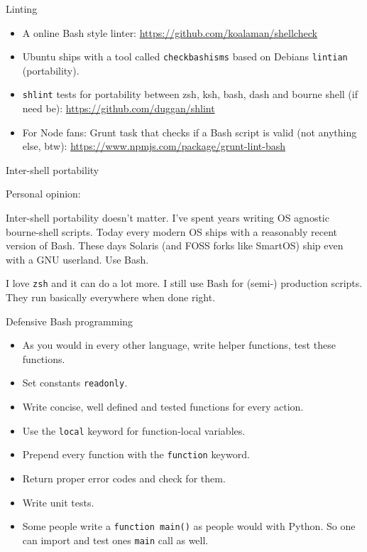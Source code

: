\begin{frame}{Linting}

\begin{itemize}
\itemsep1pt\parskip0pt
\item
  A online Bash style linter:
  \url{https://github.com/koalaman/shellcheck}
\item
  Ubuntu ships with a tool called \texttt{checkbashisms} based on
  Debians \texttt{lintian} (portability).
\item
  \texttt{shlint} tests for portability between zsh, ksh, bash, dash and
  bourne shell (if need be): \url{https://github.com/duggan/shlint}
\item
  For Node fans: Grunt task that checks if a Bash script is valid (not
  anything else, btw):
  \url{https://www.npmjs.com/package/grunt-lint-bash}
\end{itemize}

\end{frame}

\begin{frame}{Inter-shell portability}

\begin{block}{Personal opinion:}

Inter-shell portability doesn't matter. I've spent years writing OS
agnostic bourne-shell scripts. Today every modern OS ships with a
reasonably recent version of Bash. These days Solaris (and FOSS forks
like SmartOS) ship even with a GNU userland. Use Bash.

I love \texttt{zsh} and it can do a lot more. I still use Bash for
(semi-) production scripts. They run basically everywhere when done
right.

\end{block}

\end{frame}

\begin{frame}{Defensive Bash programming}

\begin{itemize}
\itemsep1pt\parskip0pt
\item
  As you would in every other language, write helper functions, test
  these functions.
\item
  Set constants \texttt{readonly}.
\item
  Write concise, well defined and tested functions for every action.
\item
  Use the \texttt{local} keyword for function-local variables.
\item
  Prepend every function with the \texttt{function} keyword.
\item
  Return proper error codes and check for them.
\item
  Write unit tests.
\item
  Some people write a \texttt{function main()} as people would with
  Python. So one can import and test ones \texttt{main} call as well.
\end{itemize}

\end{frame}

